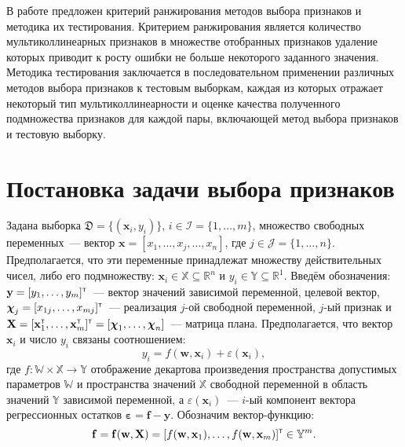 \documentclass[a4paper,12pt]{article}
\newcommand{\bx}{\mathbf{x}}
\newcommand{\bw}{\mathbf{w}}
\newcommand{\by}{\mathbf{y}}
\newcommand{\bchi}{\boldsymbol{\chi}}
\newcommand{\frakD}{\mathfrak{D}}
\newcommand{\T}{{\text{\tiny\sffamily\upshape\mdseries T}}}
\theoremstyle{plain}
\begin{document}
В работе предложен критерий ранжирования методов выбора признаков и методика их тестирования.
Критерием ранжирования является количество мультиколлинеарных признаков в множестве отобранных признаков удаление которых приводит к росту ошибки не больше некоторого заданного значения.
Методика тестирования заключается в последовательном применении различных методов выбора признаков к тестовым выборкам, каждая из которых отражает некоторый тип мультиколлинеарности и оценке качества полученного подмножества признаков для каждой пары, включающей метод выбора признаков и тестовую выборку. 


\section{Постановка задачи выбора признаков}

Задана выборка $\frakD = \{ (\bx_i, y_i) \}$, $i \in \mathcal{I} = \{1, \ldots, m \} $, множество свободных переменных~--- вектор $\bx = [x_1, \ldots, x_j, \ldots, x_n] $, где $j \in \mathcal{J} = \{ 1, \ldots, n\}$. Предполагается, что эти переменные принадлежат множеству действительных чисел, либо его подмножеству: $\bx_i \in \mathbb{X} \subseteq \mathbb{R}^n$ и $y_i \in \mathbb{Y} \subseteq \mathbb{R}^1$. Введём обозначения: $\by = [y_1, \ldots, y_m]^{\T}$~--- вектор значений зависимой переменной, целевой вектор, $\bchi_j = [x_{1j}, \ldots, x_{mj}]^{\T}$~--- реализация $j$-ой свободной переменной, $j$-ый признак и $\mathbf{X} = [\bx^{\T}_1, \ldots, \bx^{\T}_m]^{\T} = [\bchi_1, \ldots, \bchi_n]$~--- матрица плана. Предполагается, что вектор $\bx_i$ и число $y_i$ связаны соотношением:
\begin{equation}
y_i = f(\bw, \bx_i) + \varepsilon(\bx_i),
\label{eq:regr}
\end{equation}
где $f: \mathbb{W} \times \mathbb{X} \rightarrow \mathbb{Y}$ отображение декартова произведения пространства допустимых параметров $\mathbb{W}$ и пространства значений $\mathbb{X}$ свободной переменной в область значений $\mathbb{Y}$ зависимой переменной, а $\varepsilon(\bx_i)$~--- $i$-ый компонент вектора регрессионных остатков $\boldsymbol{\varepsilon} = \mathbf{f} - \by$. Обозначим вектор-функцию: 
\begin{equation*}
\mathbf{f} = \mathbf{f}(\bw, \mathbf{X}) = [f(\bw, \bx_1), \ldots, f(\bw, \bx_m)]^{\T} \in \mathbb{Y}^m.
\label{eq:model}
\end{equation*}
\end{document}
